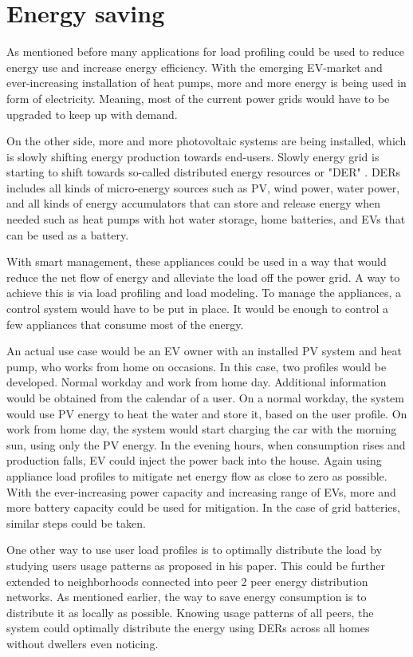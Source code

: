 \documentclass[
11pt, %
english, %
singlespacing, %
headsepline, %
]{MastersDoctoralThesis} %
\begin{document}
\section{Energy saving}

As mentioned before many applications for load profiling could be used to reduce energy use and increase energy efficiency. 
With the emerging EV-market and ever-increasing installation of heat pumps, more and more energy is being used in form of electricity. 
Meaning, most of the current power grids would have to be upgraded to keep up with demand.

On the other side, more and more photovoltaic systems are being installed, which is slowly shifting energy production towards end-users.
Slowly energy grid is starting to shift towards so-called distributed energy resources or "DER" \cite{MORENOJARAMILLO2021445}.
DERs includes all kinds of micro-energy sources such as PV, wind power, water power, and all kinds of energy accumulators that can store 
and release energy when needed such as heat pumps with hot water storage, home batteries, and EVs that can be used as a battery.

With smart management, these appliances could be used in a way that would reduce the net flow of energy and alleviate the load off the power grid.
A way to achieve this is via load profiling and load modeling. 
To manage the appliances, a control system would have to be put in place. 
It would be enough to control a few appliances that consume most of the energy. 

An actual use case would be an EV owner with an installed PV system and heat pump, who works from home on occasions. 
In this case, two profiles would be developed. Normal workday and work from home day.
Additional information would be obtained from the calendar of a user. 
On a normal workday, the system would use PV energy to heat the water and store it, based on the user profile.
On work from home day, the system would start charging the car with the morning sun, using only the PV energy. 
In the evening hours, when consumption rises and production falls, EV could inject the power back into the house.
Again using appliance load profiles to mitigate net energy flow as close to zero as possible. 
With the ever-increasing power capacity and increasing range of EVs, more and more battery capacity could be used for mitigation. 
In the case of grid batteries, similar steps could be taken.

One other way to use user load profiles is to optimally distribute the load by studying users usage patterns as \cite{Chuan2014} proposed in his paper. 
This could be further extended to neighborhoods connected into peer 2 peer energy distribution networks.
As mentioned earlier, the way to save energy consumption is to distribute it as locally as possible. 
Knowing usage patterns of all peers, the system could optimally distribute the energy using DERs across all homes without dwellers even noticing.
\end{document}
